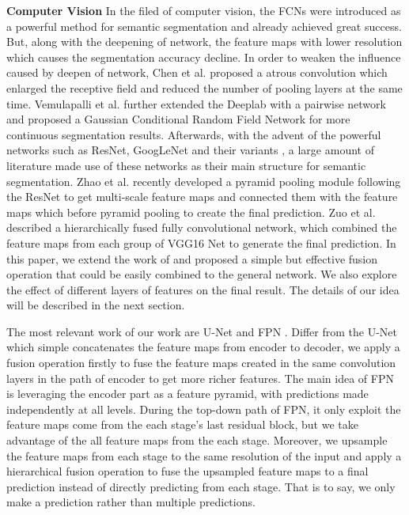 \textbf{Computer Vision} In the filed of computer vision, the FCNs \cite{IEEEexample:Long_2015_CVPR} were introduced as a powerful method for semantic segmentation and already achieved great success.
 But, along with the deepening of network, the feature maps with lower resolution which causes the segmentation accuracy decline.
 In order to weaken the influence caused by deepen of network, Chen et al.\cite{IEEEexample:chen2016deeplab} proposed a atrous convolution which enlarged the receptive field and reduced the number of pooling layers at the same time.
 Vemulapalli et al.\cite{IEEEexample:vemulapalli2016gaussian} further extended the Deeplab \cite{IEEEexample:chen2016deeplab} with a pairwise network and proposed a Gaussian Conditional Random Field Network for more continuous segmentation results.
 Afterwards, with the advent of the powerful networks such as ResNet\cite{IEEEexample:he2016deep}, GoogLeNet\cite{IEEEexample:szegedy2015going} and their variants \cite{IEEEexample:szegedy2016rethinking}\cite{IEEEexample:szegedy2017inception}\cite{IEEEexample:xie2017aggregated}, a large amount of literature made use of these networks as their main structure for semantic segmentation.
 Zhao et al.\cite{IEEEexample:zhao2017contextually} recently developed a pyramid pooling module following the ResNet\cite{IEEEexample:he2016deep} to get multi-scale feature maps and connected them with the feature maps which before pyramid pooling to create the final prediction.
 Zuo et al.\cite{IEEEexample:zuo2016hf} described a hierarchically fused fully convolutional network, which combined the feature maps from each group of VGG16 Net to generate the final prediction.
 In this paper, we extend the work of\cite{IEEEexample:zuo2016hf} and proposed a simple but effective fusion operation that could be easily combined to the general network.
 We also explore the effect of different layers of features on the final result. The details of our idea will be described in the next section.


The most relevant work of our work are U-Net\cite{IEEEexample:ronneberger2015u} and FPN \cite{IEEEexample:lin2017feature}. Differ from the U-Net which simple concatenates the feature maps from encoder to decoder, we apply a fusion operation firstly to fuse the feature maps created in the same convolution layers in the path of encoder to get more richer features. The main idea of FPN is leveraging the encoder part as a feature pyramid, with predictions made independently at all levels. During the top-down path of FPN, it only exploit the feature maps come from the each stage's last residual block, but we take advantage of the all feature maps from the each stage. Moreover, we upsample the feature maps from each stage to the same resolution of the input and apply a hierarchical fusion operation to fuse the upsampled feature maps to a final prediction instead of directly predicting from each stage. That is to say, we only make a prediction rather than multiple predictions.








